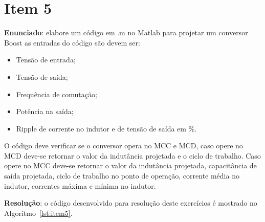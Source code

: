 \section*{Item 5}\label{it:5}

\textbf{Enunciado}: elabore um código em .m no Matlab para projetar um conversor Boost as entradas do código são devem ser:
\begin{itemize}
	\item Tensão de entrada;
	\item Tensão de saída;
	\item Frequência de comutação;
	\item Potência na saída;
	\item Ripple de corrente no indutor e de tensão de saída em \%.
\end{itemize}

O código deve verificar se o conversor opera no MCC e MCD, caso opere no MCD deve-se retornar o valor da indutância projetada e o ciclo de trabalho. Caso opere no MCC deve-se retornar o valor da indutância projetada, capacitância de saída projetada, ciclo de trabalho no ponto de operação, corrente média no indutor, correntes máxima e mínima no indutor.

\medskip
\textbf{Resolução}: o código desenvolvido para resolução deste exercícios é mostrado no Algoritmo~\ref{lst:item5}.
	
